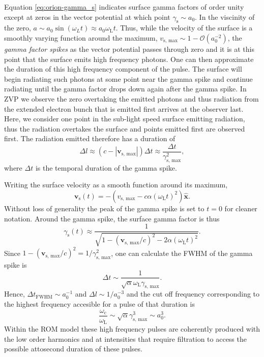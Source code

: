 Equation \ref{eq:orion-gamma_s} indicates surface gamma factors of order unity except at zeros in the vector potential at which point $\gamma_\mathrm{s} \sim a_0$. In the viscinity of the zero, $a \sim a_0\sin(\omega_L t) \approx a_0\omega_\mathrm{L}t$. Thus, while the velocity of the surface is a smoothly varying function around the maximum, $v_\mathrm{s,\, max} \sim 1 - \mathcal{O}(a_0^{-2})$, the \textit{gamma factor spikes} as the vector potential passes through zero and it is at this point that the surface emits high frequency photons. One can then approximate the duration of this high frequency component of the pulse. The surface will begin radiating such photons at some point near the gamma spike and continue radiating until the gamma factor drops down again after the gamma spike. In ZVP we observe the zero overtaking the emitted photons and thus radiation from the extended electron bunch that is emitted first arrives at the observer last. Here, we consider one point in the sub-light speed surface emitting radiation, thus the radiation overtakes the surface and points emitted first are observed first. The radiation emitted therefore has a duration of
\begin{equation}
	\Delta l \approx (c-|\mathbf{v}_\mathrm{s,\, max}|)\Delta t \approx \frac{\Delta t}{\gamma_\mathrm{s,\, max}^2},
\end{equation}
where $\Delta t$ is the temporal duration of the gamma spike. 

Writing the surface velocity as a smooth function around its maximum,
\begin{equation}\label{eq:orion-vs}
	\mathbf{v}_\mathrm{s}(t) = -(v_\mathrm{s,\, max} - c\alpha(\omega_\mathrm{L}t)^2) \mathbf{\hat{x}}.
\end{equation}
Without loss of generality the peak of the gamma spike is set to $t=0$ for cleaner notation. Around the gamma spike, the surface gamma factor is thus
\begin{equation}
	\gamma_\mathrm{s}(t) \approx \frac{1}{\sqrt{1-(\mathbf{v}_\mathrm{s,\, max}/c)^2 - 2\alpha(\omega_\mathrm{L}t)^2}}.
\end{equation}
Since $1-(\mathbf{v}_\mathrm{s,\, max}/c)^2 = 1/\gamma_\mathrm{s,\, max}^2$, one can calculate the FWHM of the gamma spike is
\begin{equation}
	\Delta t \sim \frac{1}{\sqrt{\alpha }\omega_\mathrm{L} \gamma_\mathrm{s,\, max}}.
\end{equation}
Hence, $\Delta t_\mathrm{FWHM} \sim a_0^{-1}$ and $\Delta l \sim 1/a_0^{-3}$ and the cut off frequency corresponding to the highest frequency accesible for a pulse of that duration is
\begin{equation}\label{eq:orion-omegac}
	\frac{\omega_\mathrm{c}}{\omega_\mathrm{L}} \sim \sqrt{\alpha}\gamma_\mathrm{s,\, max}^3 \sim a_0^3.
\end{equation}
Within the ROM model these high frequency pulses are coherently produced with the low order harmonics and at intensities that require filtration to access the possible attosecond duration of these pulses.

